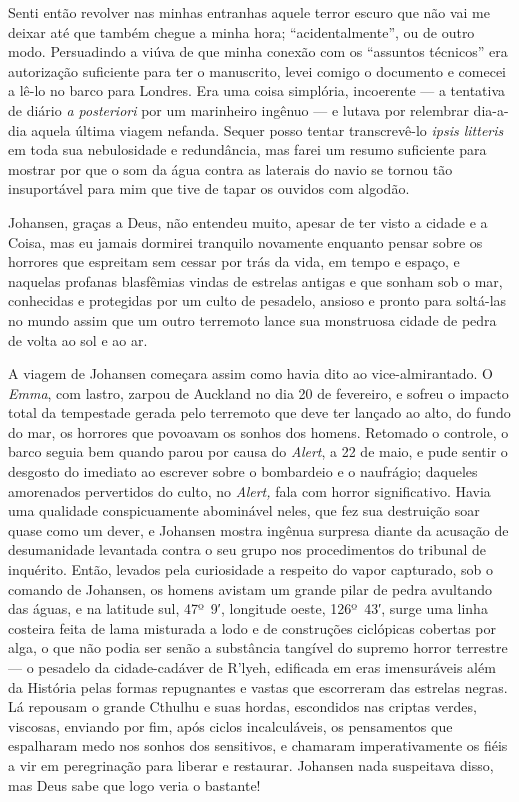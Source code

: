Senti então revolver nas minhas entranhas aquele terror escuro que não
vai me deixar até que também chegue a minha hora; ``acidentalmente'', ou
de outro modo. Persuadindo a viúva de que minha conexão com os
``assuntos técnicos'' era autorização suficiente para ter o manuscrito,
levei comigo o documento e comecei a lê-lo no barco para Londres. Era
uma coisa simplória, incoerente --- a tentativa de diário \emph{a
posteriori} por um marinheiro ingênuo --- e lutava por relembrar
dia-a-dia aquela última viagem nefanda. Sequer posso tentar
transcrevê-lo \emph{ipsis litteris} em toda sua nebulosidade e
redundância, mas farei um resumo suficiente para mostrar por que o som
da água contra as laterais do navio se tornou tão insuportável para mim
que tive de tapar os ouvidos com algodão.

Johansen, graças a Deus, não entendeu muito, apesar de ter visto a
cidade e a Coisa, mas eu jamais dormirei tranquilo novamente enquanto
pensar sobre os horrores que espreitam sem cessar por trás da vida, em
tempo e espaço, e naquelas profanas blasfêmias vindas de estrelas
antigas e que sonham sob o mar, conhecidas e protegidas por um culto de
pesadelo, ansioso e pronto para soltá-las no mundo assim que um outro
terremoto lance sua monstruosa cidade de pedra de volta ao sol e ao ar.

A viagem de Johansen começara assim como havia dito ao vice-almirantado.
O \emph{Emma}, com lastro, zarpou de Auckland no dia 20 de fevereiro, e
sofreu o impacto total da tempestade gerada pelo terremoto que deve ter
lançado ao alto, do fundo do mar, os horrores que povoavam os sonhos dos
homens. Retomado o controle, o barco seguia bem quando parou por causa
do \emph{Alert}, a 22 de maio, e pude sentir o desgosto do imediato ao
escrever sobre o bombardeio e o naufrágio; daqueles amorenados
pervertidos do culto, no \emph{Alert,} fala com horror significativo.
Havia uma qualidade conspicuamente abominável neles, que fez sua
destruição soar quase como um dever, e Johansen mostra ingênua surpresa
diante da acusação de desumanidade levantada contra o seu grupo nos
procedimentos do tribunal de inquérito. Então, levados pela curiosidade
a respeito do vapor capturado, sob o comando de Johansen, os homens
avistam um grande pilar de pedra avultando das águas, e na latitude sul,
47º~9′, longitude oeste, 126º~43′, surge uma linha costeira feita de
lama misturada a lodo e de construções ciclópicas cobertas por alga, o
que não podia ser senão a substância tangível do supremo horror
terrestre --- o pesadelo da cidade-cadáver de R'lyeh, edificada em eras
imensuráveis além da História pelas formas repugnantes e vastas que
escorreram das estrelas negras. Lá repousam o grande Cthulhu e suas
hordas, escondidos nas criptas verdes, viscosas, enviando por fim, após
ciclos incalculáveis, os pensamentos que espalharam medo nos sonhos dos
sensitivos, e chamaram imperativamente os fiéis a vir em peregrinação
para liberar e restaurar. Johansen nada suspeitava disso, mas Deus sabe
que logo veria o bastante!

